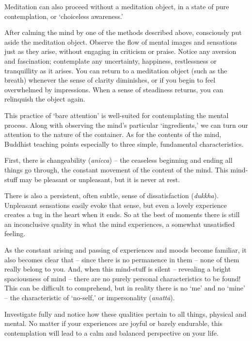 
Meditation can also proceed without a meditation object, in a state of
pure contemplation, or `choiceless awareness.'

After calming the mind by one of the methods described above,
consciously put aside the meditation object. Observe the flow of mental
images and sensations just as they arise, without engaging in criticism
or praise. Notice any aversion and fascination; contemplate any
uncertainty, happiness, restlessness or tranquillity as it arises. You
can return to a meditation object (such as the breath) whenever the
sense of clarity diminishes, or if you begin to feel overwhelmed by
impressions. When a sense of steadiness returns, you can relinquish the
object again.

This practice of `bare attention' is well-suited for contemplating the
mental process. Along with observing the mind's particular
`ingredients,' we can turn our attention to the nature of the container.
As for the contents of the mind, Buddhist teaching points especially to
three simple, fundamental characteristics.

First, there is changeability (\emph{anicca}) -- the ceaseless beginning
and ending all things go through, the constant movement of the content
of the mind. This mind-stuff may be pleasant or unpleasant, but it is
never at rest.

There is also a persistent, often subtle, sense of dissatisfaction
(\emph{dukkha}). Unpleasant sensations easily evoke that sense, but even
a lovely experience creates a tug in the heart when it ends. So at the
best of moments there is still an inconclusive quality in what the mind
experiences, a somewhat unsatisfied feeling.

As the constant arising and passing of experiences and moods become
familiar, it also becomes clear that -- since there is no permanence in
them -- none of them really belong to you. And, when this mind-stuff is
silent -- revealing a bright spaciousness of mind -- there are no purely
personal characteristics to be found! This can be difficult to
comprehend, but in reality there is no `me' and no `mine' -- the
characteristic of `no-self,' or impersonality (\emph{anattā}).

Investigate fully and notice how these qualities pertain to all things,
physical and mental. No matter if your experiences are joyful or barely
endurable, this contemplation will lead to a calm and balanced
perspective on your life.

